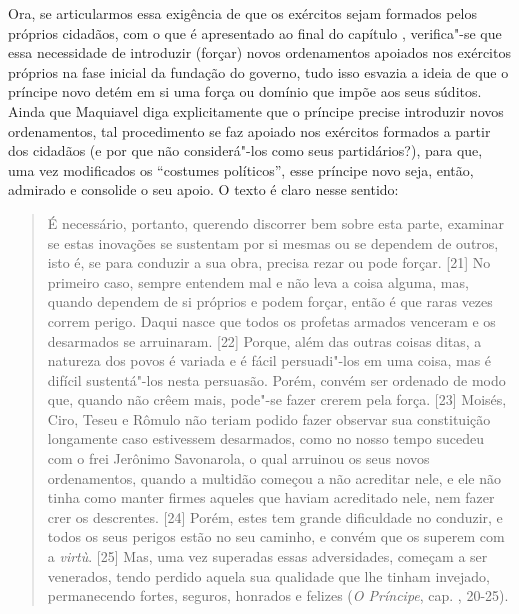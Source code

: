 Ora, se articularmos essa exigência de que os exércitos sejam formados
pelos próprios cidadãos, com o que é apresentado ao final do capítulo
, verifica"-se que essa necessidade de introduzir (forçar) novos
ordenamentos apoiados nos exércitos próprios na fase inicial da fundação
do governo, tudo isso esvazia a ideia de que o príncipe novo detém em si
uma força ou domínio que impõe aos seus súditos. Ainda que Maquiavel
diga explicitamente que o príncipe precise introduzir novos
ordenamentos, tal procedimento se faz apoiado nos exércitos formados a
partir dos cidadãos (e por que não considerá"-los como seus
partidários?), para que, uma vez modificados os ``costumes políticos'',
esse príncipe novo seja, então, admirado e consolide o seu apoio. O
texto é claro nesse sentido:

\begin{quote}
É necessário, portanto, querendo discorrer bem sobre esta parte,
examinar se estas inovações se sustentam por si mesmas ou se dependem de
outros, isto é, se para conduzir a sua obra, precisa rezar ou pode
forçar. {[}21{]} No primeiro caso, sempre entendem mal e não leva a
coisa alguma, mas, quando dependem de si próprios e podem forçar, então
é que raras vezes correm perigo. Daqui nasce que todos os profetas
armados venceram e os desarmados se arruinaram. {[}22{]} Porque, além
das outras coisas ditas, a natureza dos povos é variada e é fácil
persuadi"-los em uma coisa, mas é difícil sustentá"-los nesta persuasão.
Porém, convém ser ordenado de modo que, quando não crêem mais, pode"-se
fazer crerem pela força. {[}23{]} Moisés, Ciro, Teseu e Rômulo não
teriam podido fazer observar sua constituição longamente caso estivessem
desarmados, como no nosso tempo sucedeu com o frei Jerônimo Savonarola,
o qual arruinou os seus novos ordenamentos, quando a multidão começou a
não acreditar nele, e ele não tinha como manter firmes aqueles que
haviam acreditado nele, nem fazer crer os descrentes. {[}24{]} Porém,
estes tem grande dificuldade no conduzir, e todos os seus perigos estão
no seu caminho, e convém que os superem com a \emph{virtù}. {[}25{]}
Mas, uma vez superadas essas adversidades, começam a ser venerados,
tendo perdido aquela sua qualidade que lhe tinham invejado, permanecendo
fortes, seguros, honrados e felizes (\emph{O Príncipe}, cap. , 20-25).
\end{quote}

